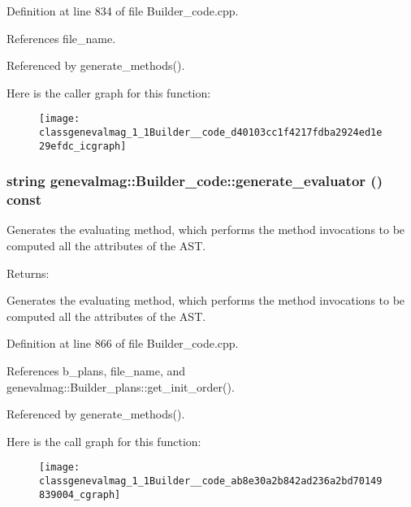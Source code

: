 Definition at line 834 of file Builder\_\-code.cpp.

References file\_\-name.

Referenced by generate\_\-methods().

Here is the caller graph for this function:\nopagebreak
\begin{figure}[H]
\begin{center}
\leavevmode
\texttt{[image: classgenevalmag\_1\_1Builder\_\_code\_d40103cc1f4217fdba2924ed1e29efdc\_icgraph]}
\end{center}
\end{figure}
\hypertarget{classgenevalmag_1_1Builder__code_ab8e30a2b842ad236a2bd70149839004}{
\subsubsection[{generate\_\-evaluator}]{\setlength{\rightskip}{0pt plus 5cm}string genevalmag::Builder\_\-code::generate\_\-evaluator () const}}
\label{classgenevalmag_1_1Builder__code_ab8e30a2b842ad236a2bd70149839004}


Generates the evaluating method, which performs the method invocations to be computed all the attributes of the AST. \begin{Desc}
\item[Returns:]\end{Desc}
Generates the evaluating method, which performs the method invocations to be computed all the attributes of the AST. 

Definition at line 866 of file Builder\_\-code.cpp.

References b\_\-plans, file\_\-name, and genevalmag::Builder\_\-plans::get\_\-init\_\-order().

Referenced by generate\_\-methods().

Here is the call graph for this function:\nopagebreak
\begin{figure}[H]
\begin{center}
\leavevmode
\texttt{[image: classgenevalmag\_1\_1Builder\_\_code\_ab8e30a2b842ad236a2bd70149839004\_cgraph]}
\end{center}
\end{figure}


